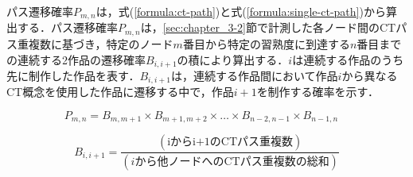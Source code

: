 \documentclass[submit,ses,noauthor]{ipsj}
\begin{document}
パス遷移確率$P_{m,n}$は，式(\ref{formula:ct-path})と式(\ref{formula:single-ct-path})から算出する．パス遷移確率$P_{m,n}$は，\ref{sec:chapter_3-2}節で計測した各ノード間のCTパス重複数に基づき，特定のノード$m$番目から特定の習熟度に到達する$n$番目までの連続する2作品の遷移確率$B_{i,i+1}$の積により算出する．$i$は連続する作品のうち先に制作した作品を表す．$B_{i,i+1}$は，連続する作品間において作品$i$から異なるCT概念を使用した作品に遷移する中で，作品$i+1$を制作する確率を示す．

\begin{equation}\label{formula:ct-path}
  P_{m,n} = B_{m,m+1} \times B_{m+1,m+2} \times \ldots \times B_{n-2,n-1} \times B_{n-1,n} \quad 
\end{equation}

\begin{equation}\label{formula:single-ct-path}
  B_{i,i+1} = \frac{(\mbox{iからi+1のCTパス重複数})}{(i\mbox{から他ノードへのCTパス重複数の総和})} 
\end{equation}




\end{document}
